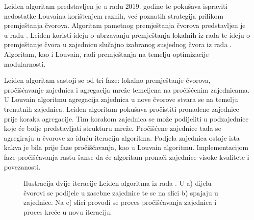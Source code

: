 \documentclass[times, utf8, diplomski]{fer}
\begin{document}
Leiden algoritam predstavljen je u radu \cite{traag2019louvain} 2019. godine te pokušava ispraviti nedostatke Louvaina korištenjem raznih, već poznatih strategija prilikom premještanja čvorova. Algoritam pametnog premještanja čvorova predstavljen je u radu \cite{waltman2013smart}. Leiden koristi ideju o ubrzavanju premještanja lokalnih iz rada \cite{ozaki2016simple} te ideju o premještanje čvora u zajednicu slučajno izabranog susjednog čvora iz rada \cite{traag2015faster}. Algoritam, kao i Louvain, radi premještanja na temelju optimizacije modularnosti.

Leiden algoritam sastoji se od tri faze: lokalno premještanje čvorova, pročišćavanje zajednica i agregacija mreže temeljena na pročišćenim zajednicama. U Louvain algoritmu agregacija zajednica u nove čvorove stvara se na temelju trenutnih zajednica. Leiden algoritam pokušava pročistiti pronađene zajednice prije koraka agregacije. Tim korakom zajednica se može podijeliti u podzajednice koje će bolje predstavljati strukturu mreže. Pročišćene zajednice tada se agregiraju u čvorove za iduću iteraciju algoritma. Podjela zajednica ostaje ista kakva je bila prije faze pročišćavanja, kao u Louvain algoritmu. Implementacijom faze pročišćavanja rastu šanse da će algoritam pronaći zajednice visoke kvalitete i povezanosti.

\begin{figure}
	\caption{Ilustracija dvije iteracije Leiden algoritma iz rada \cite{traag2019louvain}. U a) dijelu čvorovi se podijele u zasebne zajednice te se na slici b) spajaju u zajednice. Na c) slici provodi se proces pročišćavanja zajednica i proces kreće u novu iteraciju.}
	\label{fig:leiden}
\end{figure}
\end{document}
